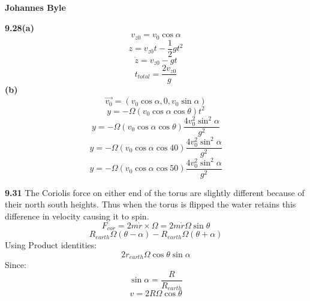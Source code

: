 \documentclass[english]{article}
\begin{document}
\begin{multicols*}{2}
\textbf{Johannes Byle}\\
\newcommand{\Lagr}{\mathcal{L}}

\noindent
\textbf{9.28(a)}
$$v_{z0}=v_0\cos\alpha$$
$$z=v_{z0}t-\frac{1}{2}gt^2$$
$$\dot{z}=v_{z0}-gt$$
$$t_{total}=\frac{2v_{z0}}{g}$$
\textbf{(b)}
$$\vec{v_0}=(v_{0}\cos\alpha,0,v_0\sin\alpha)$$
$$y=-\Omega(v_{0}\cos\alpha\cos\theta)t^2$$
$$y=-\Omega(v_{0}\cos\alpha\cos\theta)\frac{4v_0^2\sin^2\alpha}{g^2}$$
$$y=-\Omega(v_{0}\cos\alpha\cos40)\frac{4v_0^2\sin^2\alpha}{g^2}$$
$$y=-\Omega(v_{0}\cos\alpha\cos50)\frac{4v_0^2\sin^2\alpha}{g^2}$$

\noindent
\textbf{9.31}
The Coriolis force on either end of the torus are slightly different because of their north south heights. Thus when the torus is flipped the water retains this difference in velocity causing it to spin. 
$$F_{cor}=2m\dot{r}\times\Omega=2m\dot{r}\Omega\sin\theta$$
$$R_{earth}\Omega(\theta-\alpha)-R_{earth}\Omega(\theta+\alpha)$$
Using Product identities:
$$2r_{earth}\Omega\cos\theta\sin\alpha$$
Since:
$$\sin\alpha=\frac{R}{R_{earth}}$$
$$v=2R\Omega\cos\theta$$

\end{multicols*}
\end{document}
